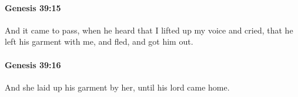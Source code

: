 		\paragraph{Genesis 39:15} %
			\label{GENESIS-39-15}

			And it came to pass, when he heard that I lifted up my voice and cried, that he left his garment with me, and fled, and got him out.


		\paragraph{Genesis 39:16} %
			\label{GENESIS-39-16}

			And she laid up his garment by her, until his lord came home.


